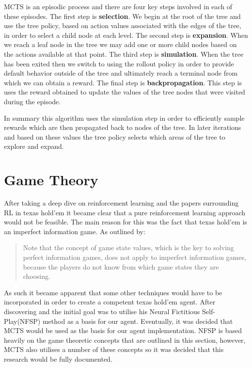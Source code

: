 MCTS is an episodic process and there are four key steps involved in each of these episodes.
The first step is \textbf{selection}.
We begin at the root of the tree and use the tree policy, based on action values associated with the edges
of the tree, in order to select a child node at each level\citep{sutton1998reinforcement}.
The second step is \textbf{expansion}.
When we reach a leaf node in the tree we may add one or more child nodes based on
the actions available at that point.
The third step is \textbf{simulation}.
When the tree has been exited then we switch to using the rollout policy in
order to provide default behavior outside of the tree and ultimately reach a
terminal node from which we can obtain a reward.
The final step is \textbf{backpropagation}.
This step is uses the reward obtained to update the values of the tree nodes that were visited
during the episode.

In summary this algorithm uses the simulation step in order to efficiently sample rewards which
are then propagated back to nodes of the tree.
In later iterations and based on these values the tree policy selects which areas of the tree to
explore and expand.

\section{Game Theory}\label{sec:gameTheory}
After taking a deep dive on reinforcement learning and the papers surrounding RL in texas hold'em it became
clear that a pure reinforcement learning approach would not be feasible.
The main reason for this was the fact that texas hold'em is an imperfect information game.
As outlined by\citep{dahl2001reinforcement}:
\begin{quotation}
Note that the concept of game state values, which is the key to solving perfect information games,
does not apply to imperfect information games, because the players do not know from  which game states they
are choosing.
\end{quotation}
As such it became apparent that some other techniques would have to be incorporated in order to create a competent
texas hold'em agent.
After discovering\citep{heinrich2016deep} and\citep{heinrich2017reinforcement} the initial goal
was to utilise his Neural Fictitious Self-Play(NFSP) method as a basis for our agent.
Eventually, it was decided that MCTS would be used as the basis for our agent implementation.
NFSP is based heavily on the game theoretic concepts that are outlined in this section, however,
MCTS also utilises a number of these concepts so it was decided that this research would be fully documented.

